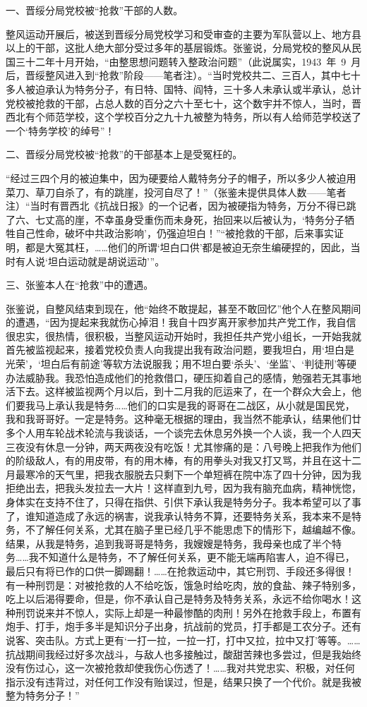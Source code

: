 一、晋绥分局党校被“抢救”干部的人数。

整风运动开展后，被送到晋绥分局党校学习和受审查的主要为军队营以上、地方县以上的干部，这批人绝大部分受过多年的基层锻炼。张鉴说，分局党校的整风从民国三十二年十月开始，“由整思想问题转入整政治问题”（此说属实，1943~年~9~月后，晋绥整风进入到“抢救”阶段——笔者注）。“当时党校共二、三百人，其中七十多人被迫承认为特务分子，有日特、国特、阎特，三十多人未承认或半承认，总计党校被抢救的干部，占总人数的百分之六十至七十，这个数宇并不惊人，当时，晋西北有个师范学校，这个学校百分之九十九被整为特务，所以有人给师范学校送了一个‘特务学校’的绰号”！

二、晋绥分局党校被“抢救”的干部基本上是受冤枉的。

“经过三四个月的被迫集中，因为硬要给人戴特务分子的帽子，所以多少人被迫用菜刀、草刀自杀了，有的跳崖，投河自尽了！”（张鉴未提供具体人数——笔者注）“当时有晋西北《抗战日报》的一个记者，因为被硬指为特务，万分不得已跳了六、七丈高的崖，不幸虽身受重伤而未身死，抬回来以后被认为，‘特务分子牺牲自己性命，破坏中共政治影响’，仍强迫坦白！”“被抢救的干部，后来事实证明，都是大冤其枉，……他们的所谓‘坦白口供’都是被迫无奈生编硬捏的，因此，当时有人说‘坦白运动就是胡说运动’”。

三、张鉴本人在“抢救”中的遭遇。

张鉴说，自整风结束到现在，他“始终不敢提起，甚至不敢回忆”他个人在整风期间的遭遇，“因为提起来我就伤心掉泪！我自十四岁离开家参加共产党工作，我自信很忠实，很热情，很积极，当整风运动开始时，我担任共产党小组长，一开始我就首先被监视起来，接着党校负责人向我提出我有政治问题，要我坦白，用‘坦白是光荣’，‘坦白后有前途’等软方法说服我；用不坦白要‘杀头’、‘坐监’、‘判徒刑’等硬办法威胁我。我恐怕造成他们的抢救借口，硬压抑着自己的感情，勉强若无其事地活下去。这样被监视两个月以后，到十二月我的厄运来了，在一个群众大会上，他们要我马上承认我是特务……他们的口实是我的哥哥在二战区，从小就是国民党，我和我哥哥好。一定是特务。这种毫无根据的理由，我当然不能承认，结果他们廿多个人用车轮战术轮流与我谈话，一个谈完去休息另外换一个人谈，我一个人四天三夜没有休息一分钟，两天两夜没有吃饭！尤其惨痛的是：八号晚上把我作为他们的阶级敌人，有的用皮带，有的用木棒，有的用拳头对我又打又骂，并且在这十二月最寒冷的天气里，把我衣服脱去只剩下一个单短裤在院中冻了四十分钟，因为我拒绝出去，把我头发拉去一大片！这样直到九号，因为我有脑充血病，精神恍惚，身体实在支持不住了，只得在指供、引供下承认我是特务分子。我本希望可以了事了，谁知道造成了永远的祸害，说我承认特务不算，还要特务关系，我本来不是特务，不了解任何关系，尤其在脑子里已经几乎不能思虑下的情形下，越编越不像。结果，从我是特务，追到我哥哥是特务，我嫂嫂是特务，我母亲也成了半个特务……我不知道什么是特务，不了解任何关系，更不能无端再陷害人，迫不得已，最后只有将已作的口供一脚踢翻！……在抢救运动中，其它刑罚、手段还多得很！有一种刑罚是：对被抢救的人不给吃饭，饿急时给吃肉，放的食盐、辣子特别多，吃上以后渴得要命，但是，你不承认自己是特务及特务关系，永远不给你喝水！这种刑罚说来并不惊人，实际上却是一种最惨酷的肉刑！另外在抢救手段上，布置有炮手、打手，炮手多半是知识分子出身，抗战前的党员，打手都是工农分子。还有说客、突击队。方式上更有‘一打一拉，一拉一打，打中又拉，拉中又打’等等。……抗战期间我经过好多次战斗，与敌人也多接触过，酸甜苦辣也多尝过，但是我始终没有伤过心，这一次被抢救却使我伤心伤透了！……我对共党忠实、积极，对任何指示没有违背过，对任何工作没有贻误过，怛是，结果只换了一个代价。就是我被整为特务分子！”

